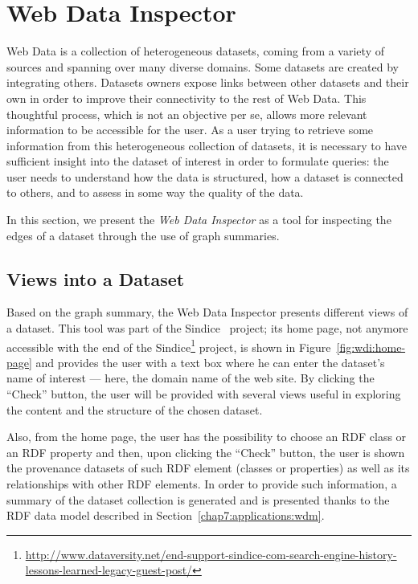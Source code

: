 \section{Web Data Inspector}
\label{sec:web-data-inspector}

Web Data is a collection of heterogeneous datasets, coming from a variety of sources and spanning over many diverse domains. Some datasets are created by integrating others. Datasets owners  expose links between other datasets and their own in order to improve their connectivity to the rest of Web Data. This thoughtful process, which is not an objective per se, allows more relevant information to be accessible for the user. As a user trying to retrieve some information from this heterogeneous collection of datasets, it is necessary to have sufficient insight into the dataset of interest in order to formulate queries: the user needs to understand how the data is structured, how a dataset is connected to others, and to assess in some way the quality of the data.

In this section, we present the \emph{Web Data Inspector} as a tool for inspecting the edges of a dataset through the use of graph summaries.

\subsection{Views into a Dataset}

Based on the graph summary, the Web Data Inspector presents different views of a dataset. This tool was part of the Sindice~\cite{oren:2008:sdl} project; its home page, not anymore accessible with the end of the Sindice\footnote{\url{http://www.dataversity.net/end-support-sindice-com-search-engine-history-lessons-learned-legacy-guest-post/}} project, is shown in Figure~\ref{fig:wdi:home-page} and provides the user with a text box where he can enter the dataset's name of interest --- here, the domain name of the web site. By clicking the ``Check'' button, the user will be provided with several views useful in exploring the content and the structure of the chosen dataset.

Also, from the home page, the user has the possibility to choose an RDF class or an RDF property and then, upon clicking the ``Check'' button, the user is shown the provenance datasets of such RDF element (classes or properties) as well as its relationships with other RDF elements. In order to provide such information, a summary of the dataset collection is generated and is presented thanks to the RDF data model described in Section~\ref{chap7:applications:wdm}.

